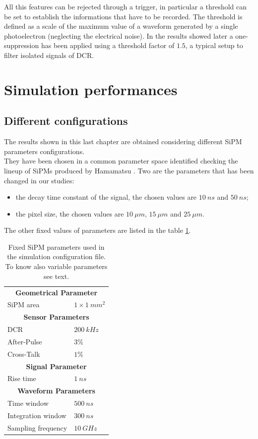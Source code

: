 All this features can be rejected through a trigger, in particular a threshold can be set to establish the informations that have to be recorded.
The threshold is defined as a scale of the maximum value of a waveform generated by a single photoelectron (neglecting the electrical noise). In the results showed later a one-suppression has been applied using a threshold factor of $1.5$, a typical setup to filter isolated signals of DCR.\\

\section{Simulation performances} \label{sec:Sim_perf}

\subsection{Different configurations} \label{subsec:SiPM_conf}
The results shown in this last chapter are obtained considering different SiPM parameters configurations.\\
They have been chosen in a common parameter space identified checking the lineup of SiPMs produced by Hamamatsu \cite{SiPM_lineup}. 
Two are the parameters that has been changed in our studies: 
\begin{itemize}
	\item the decay time constant of the signal, the chosen values are $10\ ns$ and $50\ ns$;
	\item the pixel size, the chosen values are $10\ \mu m$, $15\ \mu m$ and $25\ \mu m$.
\end{itemize}

The other fixed values of parameters are listed in the table \ref{tab:SiPM_par}.\\

\begin{table}
	\centering
	\setlength{\tabcolsep}{18pt}
	\begin{tabular}{ll}
		\toprule
		\multicolumn{2}{c}{\textbf{Geometrical Parameter}}	\\
		SiPM area	& $1 \times 1\ mm^2$	\\
		\midrule
		\multicolumn{2}{c}{\textbf{Sensor Parameters}}	\\
		DCR			& $200 \ kHz$	\\
		After-Pulse	& $3\% $	\\
		Cross-Talk	& $1\% $	\\
		\midrule
		\multicolumn{2}{c}{\textbf{Signal Parameter}}	\\
		Rise time	& $1\ ns$	\\
		\midrule
		\multicolumn{2}{c}{\textbf{Waveform Parameters}}	\\
		Time window	& $500 \ ns$	\\
		Integration window	& $300 \ ns$	\\
		Sampling frequency	& $10\ GHz$	\\
		\bottomrule
	\end{tabular}
	\caption{Fixed SiPM parameters used in the simulation configuration file. To know also variable parameters see text.}
	\label{tab:SiPM_par}
\end{table}

